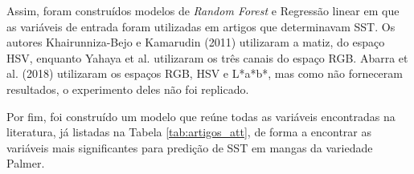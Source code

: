 Assim, foram construídos modelos de \textit{Random Forest} e Regressão linear em que as variáveis de entrada foram utilizadas em artigos que determinavam SST. Os autores Khairunniza-Bejo e Kamarudin (2011) utilizaram a matiz, do espaço HSV, enquanto Yahaya et al. utilizaram os três canais do espaço RGB. Abarra et al. (2018) utilizaram os espaços RGB, HSV e L*a*b*, mas como não forneceram resultados, o experimento deles não foi replicado. 

Por fim, foi construído um modelo que reúne todas as variáveis encontradas na literatura, já listadas na Tabela \ref{tab:artigos_att}, de forma a encontrar as variáveis mais significantes para predição de SST em mangas da variedade Palmer.


